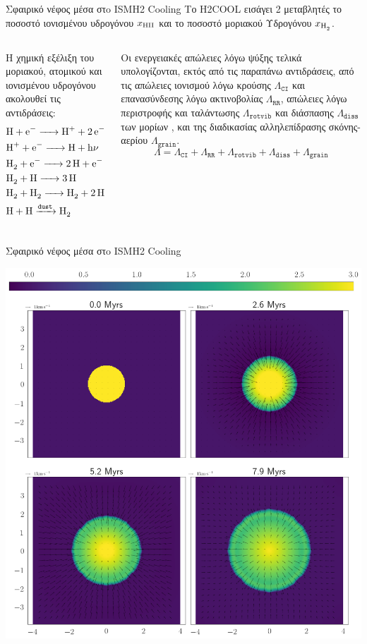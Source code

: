 \documentclass{beamer}
\begin{document}
\begin{frame}{Σφαιρικό νέφος μέσα στo ISM}{Η2 Cooling}
	Το H2COOL εισάγει 2  μεταβλητές το ποσοστό ιονισμένου υδρογόνου $x_{\ce{HII}}$ και το ποσοστό μοριακού Υδρογόνου $x_{\ce{H2}}$.
	\begin{columns}
	Η χημική εξέλιξη του μοριακού, ατομικού και ιονισμένου υδρογόνου ακολουθεί τις αντιδράσεις:
		\begin{align}
		&\ce{H + e^- -> H^+ + 2e^-} \\
		&\ce{H^+ + e^- -> H + h\nu}\\
		&\ce{H_2 + e^- -> 2H + e^-} \\
		&\ce{H_2 + H -> 3H}\\
		&\ce{H_2 + H_2 -> H_2 + 2H} \\
		&\ce{H + H ->[\mathtt{dust}] H_2}
		\end{align}
	
		Οι ενεργειακές απώλειες λόγω ψύξης τελικά υπολογίζονται, εκτός από τις παραπάνω αντιδράσεις, από τις απώλειες ιονισμού λόγω κρούσης $\Lambda _{\mathtt{CI}}$ και επανασύνδεσης λόγω ακτινοβολίας $\Lambda _{\mathtt{RR}}$, απώλειες λόγω περιστροφής και ταλάντωσης $\Lambda _{\mathtt{rotvib}}$ και διάσπασης  $\Lambda _{\mathtt{diss}}$ των μορίων , και της διαδικασίας αλληλεπίδρασης σκόνης-αερίου $\Lambda _{\mathtt{grain}}$.
		\begin{equation}
		\Lambda = \Lambda _{\mathtt{CI}} + \Lambda _{\mathtt{RR}} +\Lambda _{\mathtt{rotvib}} + \Lambda _{\mathtt{diss}} + \Lambda _{\mathtt{grain}}
		\end{equation}
	\end{columns}
\end{frame}

\begin{frame}{Σφαιρικό νέφος μέσα στo ISM}{Η2 Cooling}
			\begin{center}
				\includegraphics[width=0.6\linewidth]{../Document/DataImages/H2CoolingRHOquad}
			\end{center}

\end{frame}
\end{document}
